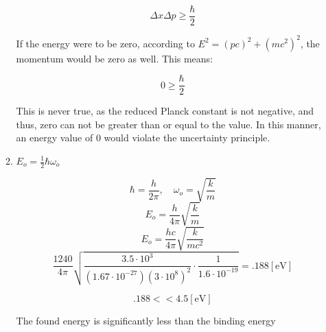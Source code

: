 \begin{enumerate}
\begin{enumerate}
        $$\Delta x \Delta p \geq \dfrac{\hbar}{2}$$

        If the energy were to be zero, according to $E^2=(pc)^2+(mc^2)^2$, the momentum would be zero as well. This means:

        $$0\geq \dfrac{\hbar}{2}$$

        This is never true, as the reduced Planck constant is not negative, and thus, zero can not be greater than or equal to the value. In this manner, an energy value of 0 would violate the uncertainty principle.

      \item $E_o=\frac{1}{2}\hbar\omega_o$

        $$\hbar = \frac{h}{2\pi},\quad \omega_o=\sqrt{\frac{k}{m}}$$
        $$E_o=\frac{h}{4\pi}\sqrt{\frac{k}{m}}$$
        $$E_o=\frac{hc}{4\pi}\sqrt{\frac{k}{mc^2}}$$
        $$\frac{1240}{4\pi}\sqrt{\frac{3.5\cdot10^3}{(1.67\cdot10^{-27})(3\cdot10^8)^2}\cdot\frac{1}{1.6\cdot10^{-19}}}=.188[\si{\eV}]$$

        $$.188 << 4.5[\si{\eV}]$$

        The found energy is significantly less than the binding energy

    \end{enumerate}

\end{enumerate}



